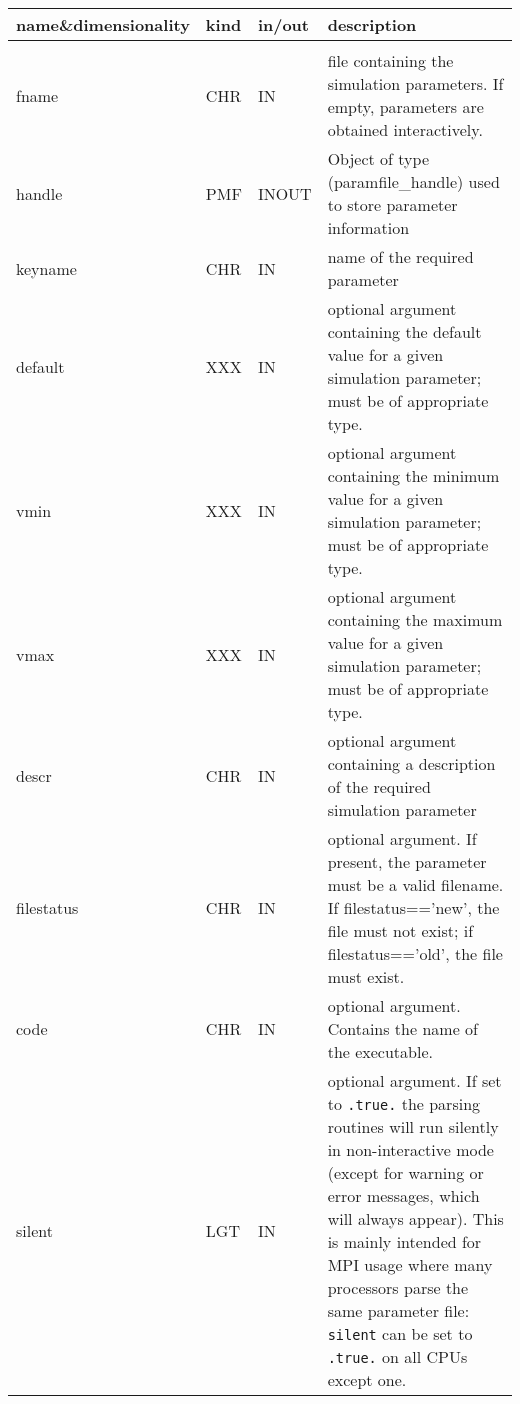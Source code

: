 \begin{arguments}
{
\begin{tabular}{p{0.3\hsize} p{0.05\hsize} p{0.1\hsize} p{0.45\hsize}} \hline  
\textbf{name\&dimensionality} & \textbf{kind} & \textbf{in/out} & \textbf{description} \\ \hline
                   &   &   &                           \\ %
fname & CHR & IN & file containing the simulation parameters.
                   If empty, parameters are obtained interactively.\\
handle & PMF & INOUT & Object of type (paramfile\_handle) used to store parameter information \\
keyname & CHR & IN & name of the required parameter \\
default & XXX & IN & optional argument containing the default value for
                     a given simulation parameter; must be of
                     appropriate type. \\
vmin & XXX & IN & optional argument containing the minimum value for
                     a given simulation parameter; must be of
                     appropriate type. \\
vmax & XXX & IN & optional argument containing the maximum value for
                     a given simulation parameter; must be of
                     appropriate type. \\
descr & CHR & IN & optional argument containing a description of the
                   required simulation parameter \\
filestatus & CHR & IN & optional argument. If present, the parameter
                   must be a valid filename. If filestatus=='new',
                   the file must not exist; if filestatus=='old',
                   the file must exist. \\
code & CHR & IN & optional argument. Contains the name of the executable.\\
silent & LGT & IN & optional argument. If set to {\tt .true.} the parsing
routines will run silently in non-interactive mode (except for warning or error
messages, which will always appear). This is mainly intended for MPI usage where
many processors parse the same parameter file: {\tt silent} can be set to
{\tt .true.} on all CPUs except one.
\end{tabular}
}
\end{arguments}
\newpage


